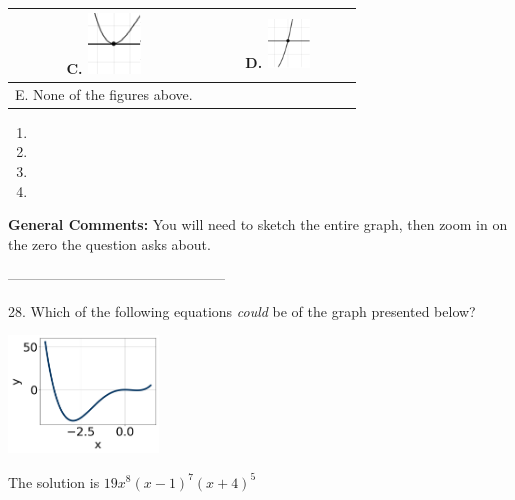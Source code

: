 \documentclass{extbook}[14pt]
\begin{document}
\begin{tabular}{|c|c|}
 \textbf{C.} \includegraphics[width=0.3\textwidth]{../Figures/polyZeroBehaviorCA.png} & \textbf{D.} \includegraphics[width=0.3\textwidth]{../Figures/polyZeroBehaviorDA.png} \tabularnewline 
\hline 
 E. None of the figures above. & \tabularnewline 
\hline 
 \end{tabular} 
 
\begin{enumerate}[label=\Alph*.] 
\item   
\item   
\item   
\item   
\end{enumerate} 
 
\textbf{General Comments:} You will need to sketch the entire graph, then zoom in on the zero the question asks about.

-----------------------------------------------

28. Which of the following equations \textit{could} be of the graph presented below?
\begin{center} \includegraphics[width=0.3\textwidth]{../Figures/polyGraphToFunctionA.png} \end{center} 

The solution is $ 19x^{8} (x - 1)^{7} (x + 4)^{5} $ 
\end{document}
